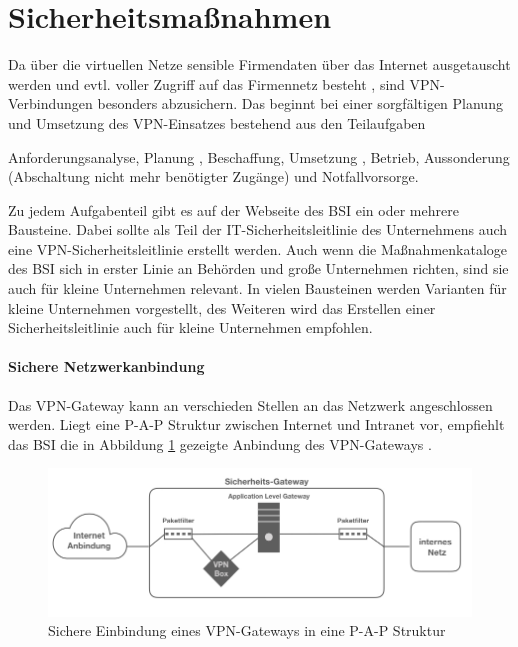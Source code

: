 \section{Sicherheitsmaßnahmen}
Da über die virtuellen Netze sensible Firmendaten über das Internet ausgetauscht werden und evtl. voller Zugriff auf das Firmennetz besteht \cite{singh2012enhancing}, sind VPN-Verbindungen besonders abzusichern. Das beginnt bei einer sorgfältigen Planung und Umsetzung des VPN-Einsatzes bestehend aus den Teilaufgaben \cite{bsivpn} 

	 Anforderungsanalyse,
 Planung ,
	 Beschaffung,
	 Umsetzung ,
 Betrieb,
	 Aussonderung (Abschaltung nicht mehr benötigter Zugänge) und
	Notfallvorsorge.

Zu jedem Aufgabenteil gibt es auf der Webseite des BSI ein oder mehrere Bausteine. 
Dabei sollte als Teil der IT-Sicherheitsleitlinie des Unternehmens auch eine VPN-Sicherheitsleitlinie erstellt werden. 
Auch wenn die Maßnahmenkataloge des BSI sich in erster Linie an Behörden und große Unternehmen richten, sind sie auch für kleine Unternehmen relevant. In vielen Bausteinen werden Varianten für kleine Unternehmen vorgestellt, des Weiteren wird das Erstellen einer Sicherheitsleitlinie auch für kleine Unternehmen empfohlen. 





\paragraph{Sichere Netzwerkanbindung}
Das VPN-Gateway kann an verschieden Stellen an das Netzwerk angeschlossen werden. Liegt eine P-A-P Struktur zwischen Internet und Intranet vor, empfiehlt das BSI die in Abbildung \ref{vpnarch} gezeigte Anbindung des VPN-Gateways \cite{isi-lana}. 

\begin{figure}[h]
	\includegraphics[width=\linewidth]{vpnarchitektur.jpeg}
	\caption{Sichere Einbindung eines VPN-Gateways in eine P-A-P Struktur}
	\label{vpnarch}
\end{figure}


